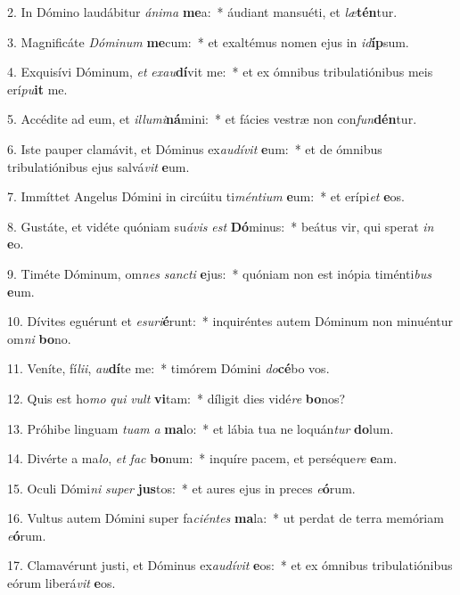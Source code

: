 2. In Dómino laudábitur \textit{á}\textit{ni}\textit{ma} \textbf{me}a:~*  áudiant mansuéti, et \textit{læ}\textbf{tén}tur.\

3. Magnificáte \textit{Dó}\textit{mi}\textit{num} \textbf{me}cum:~*  et exaltémus nomen ejus in \textit{id}\textbf{íp}sum.\

4. Exquisívi Dóminum, \textit{et} \textit{ex}\textit{au}\textbf{dí}vit me:~*  et ex ómnibus tribulatiónibus meis erí\textit{pu}\textbf{it} me.\

5. Accédite ad eum, et \textit{il}\textit{lu}\textit{mi}\textbf{ná}mini:~*  et fácies vestræ non con\textit{fun}\textbf{dén}tur.\

6. Iste pauper clamávit, et Dóminus ex\textit{au}\textit{dí}\textit{vit} \textbf{e}um:~*  et de ómnibus tribulatiónibus ejus salvá\textit{vit} \textbf{e}um.\

7. Immíttet Angelus Dómini in circúitu ti\textit{mén}\textit{ti}\textit{um} \textbf{e}um:~*  et erípi\textit{et} \textbf{e}os.\

8. Gustáte, et vidéte quóniam su\textit{á}\textit{vis} \textit{est} \textbf{Dó}minus:~*  beátus vir, qui sperat \textit{in} \textbf{e}o.\

9. Timéte Dóminum, om\textit{nes} \textit{sanc}\textit{ti} \textbf{e}jus:~*  quóniam non est inópia timénti\textit{bus} \textbf{e}um.\

10. Dívites eguérunt et \textit{e}\textit{su}\textit{ri}\textbf{é}runt:~*  inquiréntes autem Dóminum non minuéntur om\textit{ni} \textbf{bo}no.\

11. Veníte, fí\textit{li}\textit{i}, \textit{au}\textbf{dí}te me:~*  timórem Dómini \textit{do}\textbf{cé}bo vos.\

12. Quis est ho\textit{mo} \textit{qui} \textit{vult} \textbf{vi}tam:~*  díligit dies vidé\textit{re} \textbf{bo}nos?\

13. Próhibe linguam \textit{tu}\textit{am} \textit{a} \textbf{ma}lo:~*  et lábia tua ne loquán\textit{tur} \textbf{do}lum.\

14. Divérte a ma\textit{lo}, \textit{et} \textit{fac} \textbf{bo}num:~*  inquíre pacem, et perséque\textit{re} \textbf{e}am.\

15. Oculi Dómi\textit{ni} \textit{su}\textit{per} \textbf{jus}tos:~*  et aures ejus in preces \textit{e}\textbf{ó}rum.\

16. Vultus autem Dómini super fa\textit{ci}\textit{én}\textit{tes} \textbf{ma}la:~*  ut perdat de terra memóriam \textit{e}\textbf{ó}rum.\

17. Clamavérunt justi, et Dóminus ex\textit{au}\textit{dí}\textit{vit} \textbf{e}os:~*  et ex ómnibus tribulatiónibus eórum liberá\textit{vit} \textbf{e}os.\

